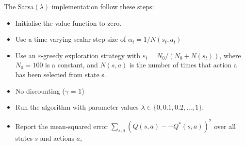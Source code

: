 \documentclass[11pt]{article}
\theoremstyle{plain}
\theoremstyle{definition}
\begin{document}
\newpage

The Sarsa$(\lambda)$ implementation follow these steps:
\begin{itemize}
\item Initialise the value function to zero.
\item Use a time-varying scalar step-size of $\alpha_t  = 1/N (s_t , a_t )$
\item Use an $\varepsilon$-greedy exploration strategy with $\varepsilon_t = N_0 /(N_0 + N (s_t))$, where$ N_0 = 100$ is a constant, and $N(s,a)$ is the number of times that action a has been selected from state s.
\item No discounting ($\gamma$ = 1)
\item Run the algorithm with parameter values $\lambda \in \{0, 0.1, 0.2, ..., 1\}$.
\item Report the mean-squared error $\sum_{s,a}(Q(s, a) −- Q^*(s, a))^2$ over all states $s$ and actions $a$,
\end{itemize}
\end{document}
